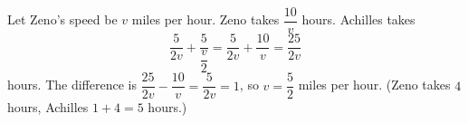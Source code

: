 Let Zeno's speed be $v$ miles per hour. Zeno takes $\dfrac{10}{v}$ hours. Achilles takes
\[
\dfrac{5}{2v}+\dfrac{5}{\dfrac {v}{2}}=\dfrac{5}{2v}+\dfrac{10}{v}=\dfrac{25}{2v}
\]
hours. The difference is $\dfrac{25}{2v}-\dfrac{10}{v}=\dfrac{5}{2v}=1$, so $v=\boxed{\dfrac{5}{2}}$ miles per hour. (Zeno takes $4$ hours, Achilles $1+4=5$ hours.)
